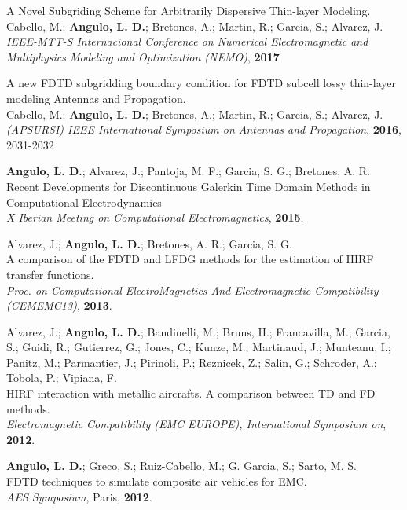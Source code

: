 \documentclass[margin,line]{res}
\begin{document}
\begin{minipage}{\textwidth}
	A Novel Subgriding Scheme for Arbitrarily Dispersive Thin-layer Modeling.\\
	Cabello, M.; \textbf{Angulo, L. D.}; Bretones, A.; Martin, R.; Garcia, S.; Alvarez, J.\\
	\textit{IEEE-MTT-S Internacional Conference on Numerical Electromagnetic and Multiphysics Modeling and Optimization (NEMO)}, \textbf{2017}
\end{minipage}

\begin{minipage}{\textwidth}
	A new FDTD subgridding boundary condition for FDTD subcell lossy thin-layer modeling Antennas and Propagation.\\
	Cabello, M.; \textbf{Angulo, L. D.}; Bretones, A.; Martin, R.; Garcia, S.; Alvarez, J.\\
	\textit{(APSURSI) IEEE International Symposium on Antennas and Propagation}, \textbf{2016}, 2031-2032
\end{minipage}

\begin{minipage}{\textwidth}
{\bf Angulo, L. D.}; Alvarez, J.; Pantoja, M. F.; Garcia, S. G.; Bretones, A. R.\\
Recent Developments for Discontinuous {Galerkin} Time Domain Methods in Computational Electrodynamics\\
{\it X Iberian Meeting on Computational Electromagnetics}, {\bf 2015}.
\end{minipage}

Alvarez, J.; {\bf Angulo, L. D.}; Bretones, A. R.; Garcia, S. G.\\
A comparison of the FDTD and LFDG methods for the estimation of HIRF transfer functions.\\
{\it Proc. on Computational ElectroMagnetics And Electromagnetic Compatibility (CEMEMC13)}, {\bf 2013}.

Alvarez, J.; {\bf Angulo, L. D.}; Bandinelli, M.; Bruns, H.; Francavilla, M.; Garcia, S.; Guidi, R.; Gutierrez, G.; Jones, C.; Kunze, M.; Martinaud, J.; Munteanu, I.; Panitz, M.; Parmantier, J.; Pirinoli, P.; Reznicek, Z.; Salin, G.; Schroder, A.; Tobola, P.; Vipiana, F.\\
HIRF interaction with metallic aircrafts. A comparison between TD and FD methods.\\
{\it Electromagnetic Compatibility (EMC EUROPE), International Symposium on}, {\bf 2012}.

{\bf Angulo, L. D.}; Greco, S.; Ruiz-Cabello, M.; G. Garcia, S.; Sarto, M. S.\\
FDTD techniques to simulate composite air vehicles for EMC.\\
{\it AES Symposium}, Paris, {\bf 2012}.
\end{document}
